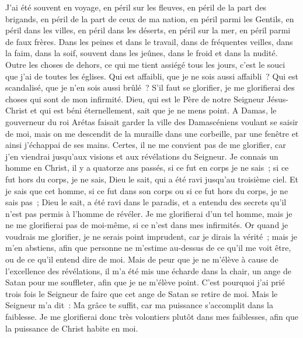 \begin{multicols}{2}
J'ai été souvent en voyage, en péril sur les fleuves, en péril de la part des brigands, en péril de la part de ceux de ma nation, en péril parmi les Gentils, en péril dans les villes, en péril dans les déserts, en péril sur la mer, en péril parmi de faux frères.
Dans les peines et dans le travail, dans de fréquentes veilles, dans la faim, dans la soif, souvent dans les jeûnes, dans le froid et dans la nudité.
Outre les choses de dehors, ce qui me tient assiégé tous les jours, c'est le souci que j'ai de toutes les églises.
Qui est affaibli, que je ne sois aussi affaibli~? Qui est scandalisé, que je n'en sois aussi brûlé~?
S'il faut se glorifier, je me glorifierai des choses qui sont de mon infirmité.
Dieu, qui est le Père de notre Seigneur Jésus-Christ et qui est béni éternellement, sait que je ne mens point.
A Damas, le gouverneur du roi Arétas faisait garder la ville des Damascéniens voulant se saisir de moi,
mais on me descendit de la muraille dans une corbeille, par une fenêtre et ainsi j'échappai de ses mains.
\VerseOne{}Certes, il ne me convient pas de me glorifier, car j'en viendrai jusqu'aux visions et aux révélations du Seigneur.
Je connais un homme en Christ, il y a quatorze ans passés, si ce fut en corps je ne sais~; si ce fut hors du corps, je ne sais, Dieu le sait, qui a été ravi jusqu'au troisième ciel.
Et je sais que cet homme, si ce fut dans son corps ou si ce fut hors du corps, je ne sais pas~; Dieu le sait,
a été ravi dans le paradis, et a entendu des secrets qu'il n'est pas permis à l'homme de révéler.
Je me glorifierai d'un tel homme, mais je ne me glorifierai pas de moi-même, si ce n'est dans mes infirmités. 
Or quand je voudrais me glorifier, je ne serais point imprudent, car je dirais la vérité~; mais je m'en abstiens, afin que personne ne m'estime au-dessus de ce qu'il me voit être, ou de ce qu'il entend dire de moi.
Mais de peur que je ne m'élève à cause de l'excellence des révélations, il m'a été mis une écharde dans la chair, un ange de Satan pour me souffleter, afin que je ne m'élève point.
C'est pourquoi j'ai prié trois fois le Seigneur de faire que cet ange de Satan se retire de moi.
Mais le Seigneur m'a dit~: Ma grâce te suffit, car ma puissance s'accomplit dans la faiblesse. Je me glorifierai donc très volontiers plutôt dans mes faiblesses, afin que la puissance de Christ habite en moi.

\end{multicols}
